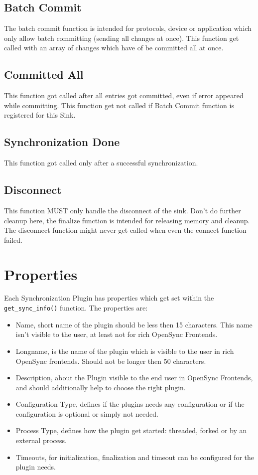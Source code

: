 \subsection{Batch Commit}
The batch commit function is intended for protocols, device or application which
only allow batch committing (sending all changes at once). This function get
called with an array of changes which have of be committed all at once.
\subsection{Committed All}
This function got called after all entries got committed, even if error appeared
while committing. This function get not called if Batch Commit function is
registered for this Sink.
\subsection{Synchronization Done}
This function got called only after a successful synchronization.
\subsection{Disconnect}
This function MUST only handle the disconnect of the sink. Don't do further
cleanup here, the finalize function is intended for releasing memory and
cleanup. The disconnect function might never get called when even the connect
function failed.
\section{Properties}
Each Synchronization Plugin has properties which get set within the
\verb|get_sync_info()| function. The properties are:

\begin{itemize}
\item Name, short name of the plugin should be less then 15 characters. This
name isn't visible to the user, at least not for rich OpenSync Frontends.
\item Longname, is the name of the plugin which is visible to the user in
rich OpenSync frontends. Should not be longer then 50 characters.
\item Description, about the Plugin visible to the end user in OpenSync
Frontends, and should additionally help to choose the right plugin.
\item Configuration Type, defines if the plugins needs any configuration or if
the configuration is optional or simply not needed.
\item Process Type, defines how the plugin get started: threaded, forked or by 
an external process.
\item Timeouts, for initialization, finalization and timeout can be configured
for the plugin needs. 
\end{itemize}

